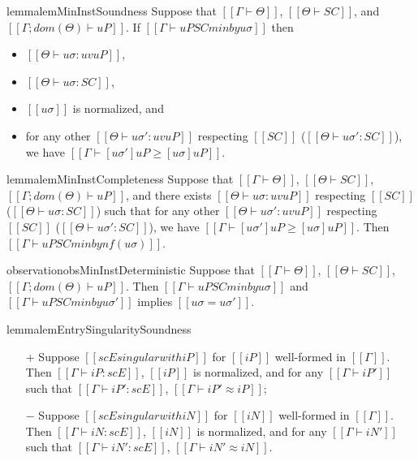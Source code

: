 \begin{restatable}{lemma}{lemMinInstSoundness}
    \label{lemma:min-inst-soundness}
    Suppose that $[[Γ ⊢ Θ]]$, $[[Θ ⊢ SC]]$, and $[[Γ; dom(Θ) ⊢ uP]]$.
    If $[[Γ ⊢ uP SC minby uσ ]]$ then
    \begin{itemize}
        \item $[[Θ ⊢ uσ : uv uP]]$,
        \item $[[Θ ⊢ uσ : SC]]$,
        \item $[[uσ]]$ is normalized, and
        \item for any other $[[Θ ⊢ uσ' : uv uP ]]$
            respecting $[[SC]]$ (\ie $[[Θ ⊢ uσ' : SC]]$), we have
            $[[Γ ⊢ [uσ']uP ≥ [uσ]uP ]]$. 
    \end{itemize}
\end{restatable}

\begin{restatable}{lemma}{lemMinInstCompleteness}
    \label{lemma:min-inst-completeness}
    Suppose that $[[Γ ⊢ Θ]]$, $[[Θ ⊢ SC]]$, $[[Γ; dom(Θ) ⊢ uP]]$, and there exists 
    $[[Θ ⊢ uσ : uv uP ]]$ respecting $[[SC]]$ ($[[Θ ⊢ uσ : SC]]$) 
    such that for any other $[[Θ ⊢ uσ' : uv uP ]]$
    respecting $[[SC]]$ ($[[Θ ⊢ uσ' : SC]]$), we have
    $[[Γ ⊢ [uσ']uP ≥ [uσ]uP ]]$. 
    Then $[[Γ ⊢ uP SC minby nf(uσ) ]]$.
\end{restatable}

\begin{restatable}{observation}{obsMinInstDeterministic}
    Suppose that $[[Γ ⊢ Θ]]$, $[[Θ ⊢ SC]]$, $[[Γ; dom(Θ) ⊢ uP]]$.
    Then $[[Γ ⊢ uP SC minby uσ]]$ and $[[Γ ⊢ uP SC minby uσ']]$ implies $[[uσ = uσ']]$.
\end{restatable}

\begin{restatable}{lemma}{lemEntrySingularitySoundness}
    \label{lemma:entry-singularity-soundness}
    \hfill
    \begin{itemize}
        \item [$+$] Suppose $[[scE singular with iP]]$ for $[[iP]]$ well-formed in $[[Γ]]$.
            Then $[[ Γ ⊢ iP : scE ]]$, $[[iP]]$ is normalized, 
            and for any $[[ Γ ⊢ iP']]$ such that $[[Γ ⊢ iP' : scE]]$, $[[Γ ⊢ iP' ≈ iP]]$;
        \item [$-$] Suppose $[[scE singular with iN]]$ for $[[iN]]$ well-formed in $[[Γ]]$.
            Then $[[ Γ ⊢ iN : scE ]]$, $[[iN]]$ is normalized,
            and for any $[[ Γ ⊢ iN']]$ such that $[[Γ ⊢ iN' : scE]]$, $[[Γ ⊢ iN' ≈ iN]]$.
    \end{itemize}
\end{restatable}

